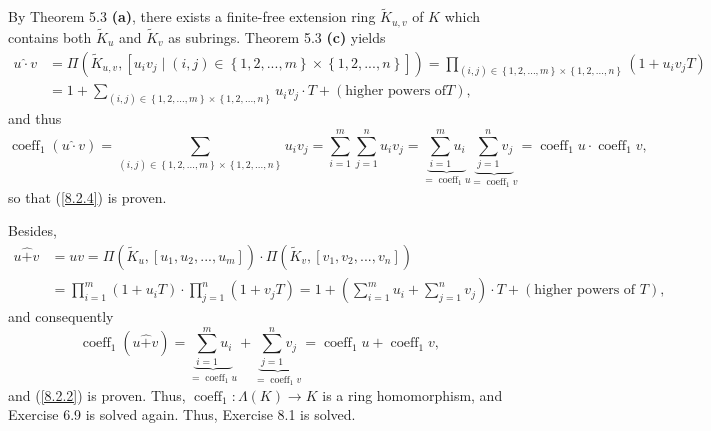\documentclass[numbers=enddot,12pt,final,onecolumn,notitlepage]{scrartcl}%
\begin{document}
By Theorem 5.3 \textbf{(a)}, there exists a finite-free extension ring
$\widetilde{K}_{u,v}$ of $K$ which contains both $\widetilde{K}_{u}$ and
$\widetilde{K}_{v}$ as subrings. Theorem 5.3 \textbf{(c)} yields%
\begin{align*}
u\widehat{\cdot}v  &  =\Pi\left(  \widetilde{K}_{u,v},\left[  u_{i}v_{j}%
\mid\left(  i,j\right)  \in\left\{  1,2,...,m\right\}  \times\left\{
1,2,...,n\right\}  \right]  \right)  =\prod_{\left(  i,j\right)  \in\left\{
1,2,...,m\right\}  \times\left\{  1,2,...,n\right\}  }\left(  1+u_{i}%
v_{j}T\right) \\
&  =1+\sum_{\left(  i,j\right)  \in\left\{  1,2,...,m\right\}  \times\left\{
1,2,...,n\right\}  }u_{i}v_{j}\cdot T+\left(  \text{higher powers of
}T\right)  ,
\end{align*}
and thus%
\[
\operatorname*{coeff}\nolimits_{1}\left(  u\widehat{\cdot}v\right)
=\sum_{\left(  i,j\right)  \in\left\{  1,2,...,m\right\}  \times\left\{
1,2,...,n\right\}  }u_{i}v_{j}=\sum_{i=1}^{m}\sum_{j=1}^{n}u_{i}%
v_{j}=\underbrace{\sum_{i=1}^{m}u_{i}}_{=\operatorname*{coeff}\nolimits_{1}%
u}\underbrace{\sum_{j=1}^{n}v_{j}}_{=\operatorname*{coeff}\nolimits_{1}%
v}=\operatorname*{coeff}\nolimits_{1}u\cdot\operatorname*{coeff}%
\nolimits_{1}v,
\]
so that (\ref{8.2.4}) is proven.

Besides,%
\begin{align*}
u\widehat{+}v  &  =uv=\Pi\left(  \widetilde{K}_{u},\left[  u_{1}%
,u_{2},...,u_{m}\right]  \right)  \cdot\Pi\left(  \widetilde{K}_{v},\left[
v_{1},v_{2},...,v_{n}\right]  \right) \\
&  =\prod_{i=1}^{m}\left(  1+u_{i}T\right)  \cdot\prod_{j=1}^{n}\left(
1+v_{j}T\right)  =1+\left(  \sum_{i=1}^{m}u_{i}+\sum_{j=1}^{n}v_{j}\right)
\cdot T+\left(  \text{higher powers of }T\right)  ,
\end{align*}
and consequently%
\[
\operatorname*{coeff}\nolimits_{1}\left(  u\widehat{+}v\right)
=\underbrace{\sum_{i=1}^{m}u_{i}}_{=\operatorname*{coeff}\nolimits_{1}%
u}+\underbrace{\sum_{j=1}^{n}v_{j}}_{=\operatorname*{coeff}\nolimits_{1}%
v}=\operatorname*{coeff}\nolimits_{1}u+\operatorname*{coeff}\nolimits_{1}v,
\]
and (\ref{8.2.2}) is proven. Thus, $\operatorname*{coeff}\nolimits_{1}%
:\Lambda\left(  K\right)  \rightarrow K$ is a ring homomorphism, and Exercise
6.9 is solved again. Thus, Exercise 8.1 is solved.
\end{document}
